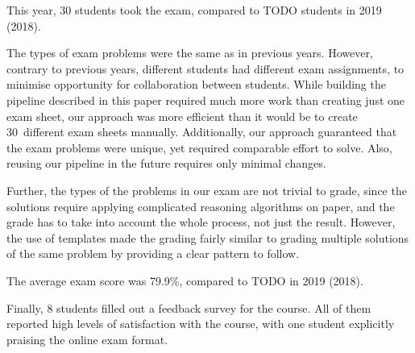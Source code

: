 This year, 30 students took the exam, compared to TODO students in 2019 (2018).

The types of exam problems were the same as in previous years.
However, contrary to previous years, different students had different exam
assignments, to minimise opportunity for collaboration between students.
%
While building the pipeline described in this paper required much more work
than creating just one exam sheet, our approach was more efficient than
it would be to create 30~different exam sheets manually. Additionally,
our approach guaranteed that the exam problems were
unique, yet required comparable effort to solve.
Also, reusing our pipeline in the future requires only minimal changes.

Further, the types of the problems in our exam are not trivial to grade, since
the solutions require applying complicated reasoning algorithms on paper, and
the grade has to take into account the whole process, not just the result.
However, the use of templates made the grading fairly similar to grading multiple
solutions of the same problem by providing a clear pattern to follow.

The average exam score was 79.9\%, compared to TODO in 2019 (2018).

Finally, 8 students filled out a feedback survey for the course. All of them reported
high levels of satisfaction with the course, with one student explicitly praising the
online exam format.
